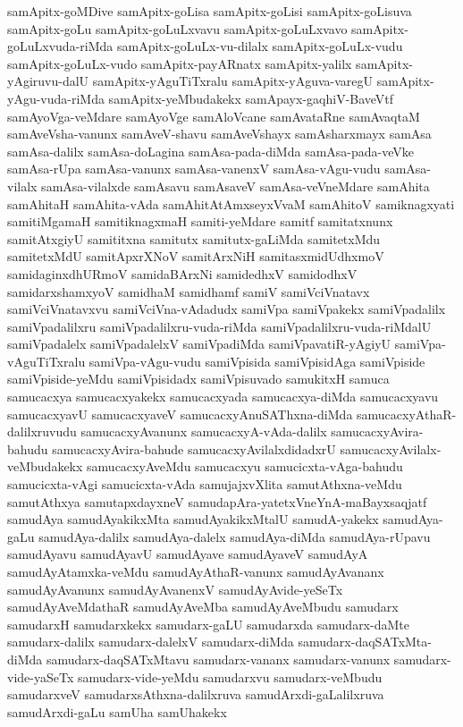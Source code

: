 {samApitx-goMDive
samApitx-goLisa
samApitx-goLisi
samApitx-goLisuva
samApitx-goLu
samApitx-goLuLxvavu
samApitx-goLuLxvavo
samApitx-goLuLxvuda-riMda
samApitx-goLuLx-vu-dilalx
samApitx-goLuLx-vudu
samApitx-goLuLx-vudo
samApitx-payARnatx
samApitx-yalilx
samApitx-yAgiruvu-dalU
samApitx-yAguTiTxralu
samApitx-yAguva-varegU
samApitx-yAgu-vuda-riMda
samApitx-yeMbudakekx
samApayx-gaqhiV-BaveVtf
samAyoVga-veMdare
samAyoVge
samAloVcane
samAvataRne
samAvaqtaM
samAveVsha-vanunx
samAveV-shavu
samAveVshayx
samAsharxmayx
samAsa
samAsa-dalilx
samAsa-doLagina
samAsa-pada-diMda
samAsa-pada-veVke
samAsa-rUpa
samAsa-vanunx
samAsa-vanenxV
samAsa-vAgu-vudu
samAsa-vilalx
samAsa-vilalxde
samAsavu
samAsaveV
samAsa-veVneMdare
samAhita
samAhitaH
samAhita-vAda
samAhitAtAmxseyxVvaM
samAhitoV
samiknagxyati
samitiMgamaH
samitiknagxmaH
samiti-yeMdare
samitf
samitatxnunx
samitAtxgiyU
samititxna
samitutx
samitutx-gaLiMda
samitetxMdu
samitetxMdU
samitApxrXNoV
samitArxNiH
samitasxmidUdhxmoV
samidaginxdhURmoV
samidaBArxNi
samidedhxV
samidodhxV
samidarxshamxyoV
samidhaM
samidhamf
samiV
samiVciVnatavx
samiVciVnatavxvu
samiVciVna-vAdadudx
samiVpa
samiVpakekx
samiVpadalilx
samiVpadalilxru
samiVpadalilxru-vuda-riMda
samiVpadalilxru-vuda-riMdalU
samiVpadalelx
samiVpadalelxV
samiVpadiMda
samiVpavatiR-yAgiyU
samiVpa-vAguTiTxralu
samiVpa-vAgu-vudu
samiVpisida
samiVpisidAga
samiVpiside
samiVpiside-yeMdu
samiVpisidadx
samiVpisuvado
samukitxH
samuca
samucacxya
samucacxyakekx
samucacxyada
samucacxya-diMda
samucacxyavu
samucacxyavU
samucacxyaveV
samucacxyAnuSAThxna-diMda
samucacxyAthaR-dalilxruvudu
samucacxyAvanunx
samucacxyA-vAda-dalilx
samucacxyAvira-bahudu
samucacxyAvira-bahude
samucacxyAvilalxdidadxrU
samucacxyAvilalx-veMbudakekx
samucacxyAveMdu
samucacxyu
samucicxta-vAga-bahudu
samucicxta-vAgi
samucicxta-vAda
samujajxvXlita
samutAthxna-veMdu
samutAthxya
samutapxdayxneV
samudapAra-yatetxVneYnA-maBayxsaqjatf
samudAya
samudAyakikxMta
samudAyakikxMtalU
samudA-yakekx
samudAya-gaLu
samudAya-dalilx
samudAya-dalelx
samudAya-diMda
samudAya-rUpavu
samudAyavu
samudAyavU
samudAyave
samudAyaveV
samudAyA
samudAyAtamxka-veMdu
samudAyAthaR-vanunx
samudAyAvananx
samudAyAvanunx
samudAyAvanenxV
samudAyAvide-yeSeTx
samudAyAveMdathaR
samudAyAveMba
samudAyAveMbudu
samudarx
samudarxH
samudarxkekx
samudarx-gaLU
samudarxda
samudarx-daMte
samudarx-dalilx
samudarx-dalelxV
samudarx-diMda
samudarx-daqSATxMta-diMda
samudarx-daqSATxMtavu
samudarx-vananx
samudarx-vanunx
samudarx-vide-yaSeTx
samudarx-vide-yeMdu
samudarxvu
samudarx-veMbudu
samudarxveV
samudarxsAthxna-dalilxruva
samudArxdi-gaLalilxruva
samudArxdi-gaLu
samUha
samUhakekx
}
